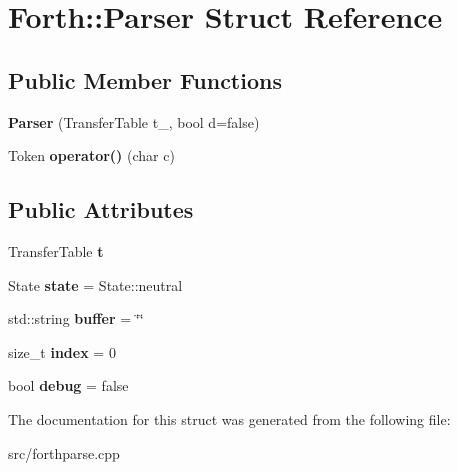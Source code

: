 \hypertarget{struct_forth_1_1_parser}{\section{Forth\-:\-:Parser Struct Reference}
\label{struct_forth_1_1_parser}
}
\subsection*{Public Member Functions}
\begin{DoxyCompactItemize}
\item 
\hypertarget{struct_forth_1_1_parser_a0f5e9c9cd1874f4fb6faa57b33877338}{{\bfseries Parser} (Transfer\-Table t\-\_\-, bool d=false)}\label{struct_forth_1_1_parser_a0f5e9c9cd1874f4fb6faa57b33877338}

\item 
\hypertarget{struct_forth_1_1_parser_ac1ef41a05078393e4d24bee040260730}{Token {\bfseries operator()} (char c)}\label{struct_forth_1_1_parser_ac1ef41a05078393e4d24bee040260730}

\end{DoxyCompactItemize}
\subsection*{Public Attributes}
\begin{DoxyCompactItemize}
\item 
\hypertarget{struct_forth_1_1_parser_aa30371d1f8b0212d28b2e30191a07d83}{Transfer\-Table {\bfseries t}}\label{struct_forth_1_1_parser_aa30371d1f8b0212d28b2e30191a07d83}

\item 
\hypertarget{struct_forth_1_1_parser_aafe6cbb11f5c777f7897dba0aae0b327}{State {\bfseries state} = State\-::neutral}\label{struct_forth_1_1_parser_aafe6cbb11f5c777f7897dba0aae0b327}

\item 
\hypertarget{struct_forth_1_1_parser_a383e4eb65d624c200808c98cbe0ee66b}{std\-::string {\bfseries buffer} = \char`\"{}\char`\"{}}\label{struct_forth_1_1_parser_a383e4eb65d624c200808c98cbe0ee66b}

\item 
\hypertarget{struct_forth_1_1_parser_a3fea802957913ce92e543e68de18950c}{size\-\_\-t {\bfseries index} = 0}\label{struct_forth_1_1_parser_a3fea802957913ce92e543e68de18950c}

\item 
\hypertarget{struct_forth_1_1_parser_a752540ab4b976ae05d41203f9c9c9661}{bool {\bfseries debug} = false}\label{struct_forth_1_1_parser_a752540ab4b976ae05d41203f9c9c9661}

\end{DoxyCompactItemize}


The documentation for this struct was generated from the following file\-:\begin{DoxyCompactItemize}
\item 
src/forthparse.\-cpp\end{DoxyCompactItemize}
